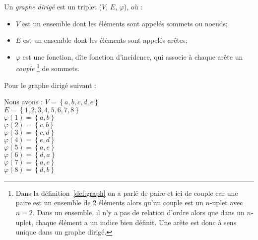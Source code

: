 \begin{mydef}
  Un \emph{graphe dirigé} est un triplet ($V$, $E$, $\varphi$), où :
  \begin{itemize}
    \item $V$ est un ensemble dont les éléments sont appelés sommets ou noeuds;
    \item $E$ est un ensemble dont les éléments sont appelés arêtes;
    \item $\varphi$ est une fonction, dîte fonction d'incidence, qui associe à chaque arête un \emph{couple}
      \footnote{Dans la définition~\ref{def:graph} on a parlé de paire et ici de couple car une paire est
        un ensemble de 2 éléments alors qu'un couple est un $n$-uplet avec $n = 2$.
        Dans un ensemble, il n'y a pas de relation d'ordre alors que dans un $n$-uplet,
        chaque élément a un indice bien définit.
        Une arête est donc à sens unique dans un graphe dirigé.}
      de sommets.
  \end{itemize}
\end{mydef}

\begin{myexem}
Pour le graphe dirigé suivant :
  \begin{center}
  \end{center}
	Nous avons :
	$V=\left\{a,b,c,d,e\right\}$\\
	$E=\left\{1,2,3,4,5,6,7,8\right\}$\\
	$\varphi(1)=\left\{a,b\right\}$\\
	$\varphi(2)=\left\{c,b\right\}$\\
	$\varphi(3)=\left\{c,d\right\}$\\
	$\varphi(4)=\left\{e,d\right\}$\\
	$\varphi(5)=\left\{a,e\right\}$\\
	$\varphi(6)=\left\{d,a\right\}$\\
	$\varphi(7)=\left\{a,c\right\}$\\
	$\varphi(8)=\left\{d,b\right\}$\\

\end{myexem}


